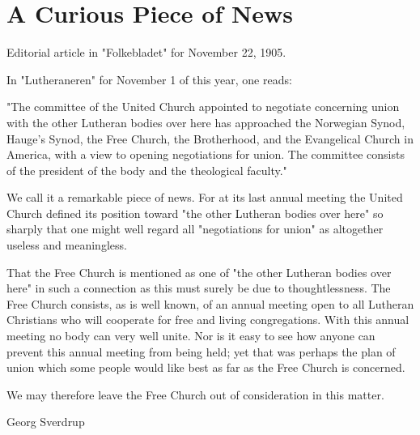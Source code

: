 
\section{A Curious Piece of News}

Editorial article in "Folkebladet" for November 22, 1905.

In "Lutheraneren" for November 1 of this year, one reads:

"The committee of the United Church appointed to negotiate concerning union with the other Lutheran bodies over here has approached the Norwegian Synod, Hauge's Synod, the Free Church, the Brotherhood, and the Evangelical Church in America, with a view to opening negotiations for union. The committee consists of the president of the body and the theological faculty."

We call it a remarkable piece of news. For at its last annual meeting the United Church defined its position toward "the other Lutheran bodies over here" so sharply that one might well regard all "negotiations for union" as altogether useless and meaningless.

That the Free Church is mentioned as one of "the other Lutheran bodies over here" in such a connection as this must surely be due to thoughtlessness. The Free Church consists, as is well known, of an annual meeting open to all Lutheran Christians who will cooperate for free and living congregations. With this annual meeting no body can very well unite. Nor is it easy to see how anyone can prevent this annual meeting from being held; yet that was perhaps the plan of union which some people would like best as far as the Free Church is concerned.

We may therefore leave the Free Church out of consideration in this matter.

Georg Sverdrup
